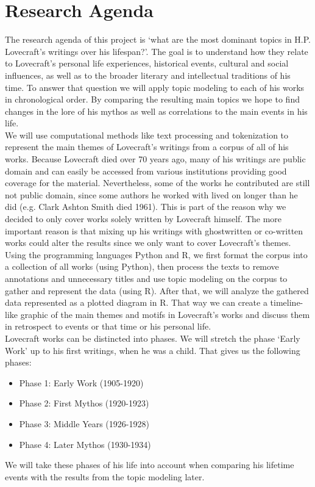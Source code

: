 \section{Research Agenda}

The research agenda of this project is ‘what are the most dominant topics in H.P. Lovecraft’s 
writings over his lifespan?’. The goal is to understand how they relate to Lovecraft’s personal 
life experiences, historical events, cultural and social influences, as well as to the broader 
literary and intellectual traditions of his time. To answer that question we will apply topic 
modeling to each of his works in chronological order. By comparing the resulting main topics 
we hope to find changes in the lore of his mythos as well as correlations to the main events 
in his life.\\

We will use computational methods like text processing and tokenization to 
represent the main themes of Lovecraft’s writings from a corpus of all of his works. Because 
Lovecraft died over 70 years ago, many of his writings are public domain and can easily be 
accessed from various institutions providing good coverage for the material. Nevertheless, 
some of the works he contributed are still not public domain, since some authors he worked 
with lived on longer than he did (e.g. Clark Ashton Smith died 1961). This is part of the 
reason why we decided to only cover works solely written by Lovecraft himself. The more 
important reason is that mixing up his writings with ghostwritten or co-written works could 
alter the results since we only want to cover Lovecraft’s themes. Using the programming 
languages Python and R, we first format the corpus into a collection of all works (using 
Python), then process the texts to remove annotations and unnecessary titles and use topic 
modeling on the corpus to gather and represent the data (using R). After that, we will analyze 
the gathered data represented as a plotted diagram in R. That way we can create a timeline-like 
graphic of the main themes and motifs in Lovecraft’s works and discuss them in retrospect to 
events or that time or his personal life.\\

Lovecraft works can be distincted into phases. We will stretch the phase ‘Early Work’ 
up to his first writings, when he was a child. That gives us the following phases:
\begin{itemize}
    \item Phase 1: Early Work (1905-1920)
    \item Phase 2: First Mythos (1920-1923)
    \item Phase 3: Middle Years (1926-1928)
    \item Phase 4: Later Mythos (1930-1934)
\end{itemize}
We will take these phases of his life into account when comparing his lifetime events 
with the results from the topic modeling later.\\

